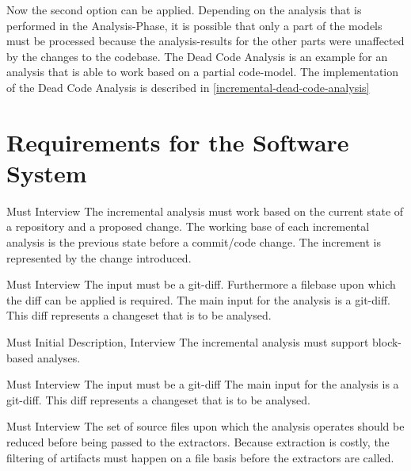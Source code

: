 \documentclass[a4paper]{article}
\begin{document}
Now the second option can be applied. Depending on the analysis that is performed in the Analysis-Phase, it is possible that only a part of the models must be processed because the analysis-results for the other parts were unaffected by the changes to the codebase. The Dead Code Analysis is an example for an analysis that is able to work based on a partial code-model. The implementation of the Dead Code Analysis  is described in \autoref{incremental-dead-code-analysis}


\clearpage
\section{Requirements for the Software System}

\begin{req}
	\reqtable
	{Must}  {Interview}
	{The incremental analysis must work based on the current state of a repository and a proposed change. }
	{The working base of each incremental analysis is the previous state before a commit/code change. The increment is represented by the change introduced.}
	
	\begin{subreq} \label{req:git-diff}
		\reqtable
		{Must}  {Interview}
		{The input must be a git-diff. Furthermore a filebase upon which the diff can be applied is required.}
		{The main input for the analysis is a git-diff. This diff represents a changeset that is to be analysed.}
	\end{subreq}
\end{req}

\begin{req}
	\reqtable
	{Must}  {Initial Description, Interview}
	{The incremental analysis must support block-based analyses.}
	{}
	
	\begin{subreq} \label{req:git-diff}
		\reqtable
		{Must}  {Interview}
		{The input must be a git-diff}
		{The main input for the analysis is a git-diff. This diff represents a changeset that is to be analysed.}
	\end{subreq}
\end{req}


\begin{req} \label{req:early-filtering}
\reqtable
	{Must}  {Interview}
	{The set of source files upon which the analysis operates should be reduced before being passed to the extractors.}
	{Because extraction is costly, the filtering of artifacts must happen on a file basis before the extractors are called.}
\end{req}
\end{document}
